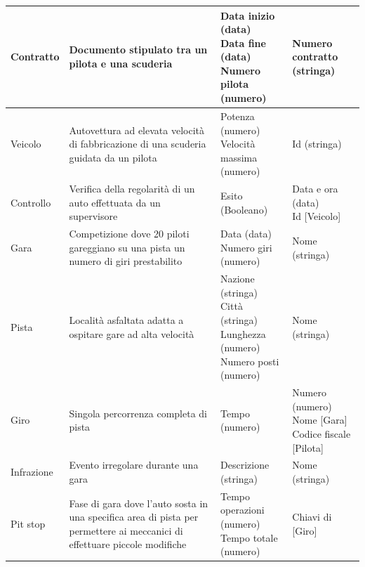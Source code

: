 \documentclass[11pt]{article}
\begin{document}
\begin{center}
{\begin{tabular}{ |l|p{5.5cm}|p{5cm}|p{4cm}| }
        \hline
        Contratto &
        Documento stipulato tra un pilota e una scuderia & 
        \parbox[t]{\linewidth}{Data inizio (data)\\Data fine (data)\\Numero pilota (numero)} & 
        Numero contratto (stringa) \\

        \hline
        Veicolo &
        Autovettura ad elevata velocità di fabbricazione di una scuderia guidata da un pilota &
        \parbox[t]{\linewidth}{Potenza (numero)\\Velocità massima (numero)} & 
        Id (stringa) \\

        \hline
        Controllo &
        Verifica della regolarità di un auto effettuata da un supervisore & 
        \parbox[t]{\linewidth}{Esito (Booleano)} & 
        \parbox[t]{\linewidth}{Data e ora (data)\\Id [Veicolo] } \\

        \hline
        Gara &
        Competizione dove 20 piloti gareggiano su una pista un numero di giri prestabilito & 
        \parbox[t]{\linewidth}{Data (data)\\Numero giri (numero)} & 
        Nome (stringa) \\

        \hline
        Pista &
        Località asfaltata adatta a ospitare gare ad alta velocità & 
        \parbox[t]{\linewidth}{Nazione (stringa)\\Città (stringa)\\Lunghezza (numero)\\Numero posti (numero)} & 
        Nome (stringa) \\

        \hline
        Giro &
        Singola percorrenza completa di pista & 
        \parbox[t]{\linewidth}{Tempo (numero)} & 
        \parbox[t]{\linewidth}{Numero (numero)\\Nome [Gara]\\Codice fiscale [Pilota]} \\ 

        \hline
        Infrazione &
        Evento irregolare durante una gara & 
        \parbox[t]{\linewidth}{Descrizione (stringa)} & 
        Nome (stringa) \\

        \hline
        Pit stop &
        Fase di gara dove l'auto sosta in una specifica area di pista per permettere ai meccanici di effettuare piccole modifiche & 
        \parbox[t]{\linewidth}{Tempo operazioni (numero)\\Tempo totale (numero)} & 
        Chiavi di [Giro] \\

        \hline
    \end{tabular}
}
\end{center}
\end{document}
